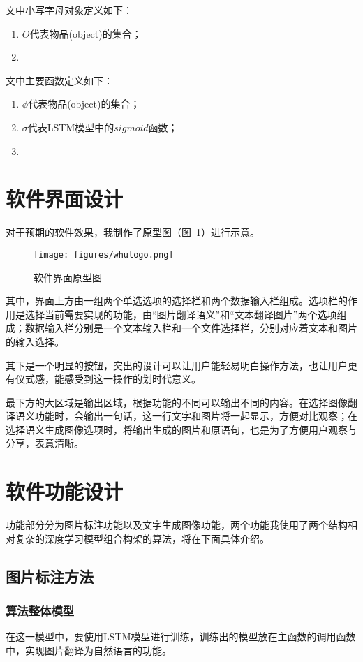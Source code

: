 文中小写字母对象定义如下：
\begin{enumerate}[fullwidth,itemindent=2em,label=\arabic*.]
    \item $O$代表物品(object)的集合；
    \item 
\end{enumerate}

文中主要函数定义如下：
\begin{enumerate}[fullwidth,itemindent=2em,label=\arabic*.]
    \item $\phi$代表物品(object)的集合；
    \item $\sigma$代表LSTM模型中的$sigmoid$函数；
    \item 
\end{enumerate}

\section{软件界面设计}
对于预期的软件效果，我制作了原型图（图~\ref{fig:UIproto}）进行示意。
\begin{figure}[!htb]
    \centering
    \texttt{[image: figures/whulogo.png]}
    \caption{软件界面原型图}
    \label{fig:UIproto}
  \end{figure}

  其中，界面上方由一组两个单选选项的选择栏和两个数据输入栏组成。选项栏的作用是选择当前需要实现的功能，由“图片翻译语义”和“文本翻译图片”两个选项组成；数据输入栏分别是一个文本输入栏和一个文件选择栏，分别对应着文本和图片的输入选择。

  其下是一个明显的按钮，突出的设计可以让用户能轻易明白操作方法，也让用户更有仪式感，能感受到这一操作的划时代意义。

  最下方的大区域是输出区域，根据功能的不同可以输出不同的内容。在选择图像翻译语义功能时，会输出一句话，这一行文字和图片将一起显示，方便对比观察；在选择语义生成图像选项时，将输出生成的图片和原语句，也是为了方便用户观察与分享，表意清晰。

\section{软件功能设计}
功能部分分为图片标注功能以及文字生成图像功能，两个功能我使用了两个结构相对复杂的深度学习模型组合构架的算法，将在下面具体介绍。
 
\subsection{图片标注方法}
\subsubsection{算法整体模型}
在这一模型中，要使用LSTM模型进行训练，训练出的模型放在主函数的调用函数中，实现图片翻译为自然语言的功能。

